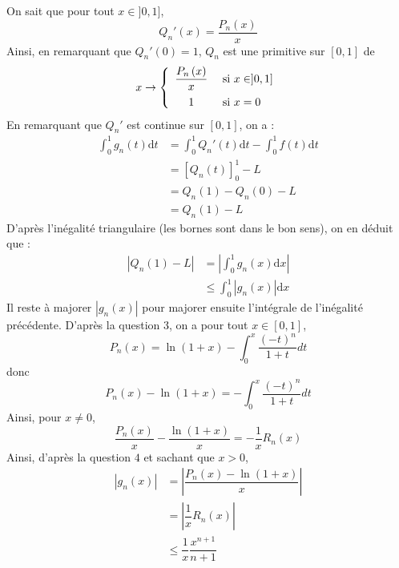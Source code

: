 \documentclass[a4paper,twoside,french,10pt]{VcCours}
\newcommand{\dt}{\text{d}t}
\newcommand{\dx}{\text{d}x}
\begin{document}
\begin{enumerate}
\noindent On sait que pour tout $x \in ]0,1]$,
$$Q_{n}'\left(  x\right)  =\dfrac{P_{n}\left(  x\right)  }{x}$$
Ainsi, en remarquant que $Q_n'(0)=1$, $Q_{n}$ est une primitive sur $[0,1]$ de 
$$x\rightarrow   \left\lbrace \begin{array}{cl}
\dfrac{P_{n}\left(  x\right)  }{x} & \hbox{ si } x \in ]0,1] \\[0.3cm]
1 & \hbox{ si } x=0 \\
\end{array}\right.$$
En remarquant que $Q_n'$ est continue sur $[0,1]$, on a :
\begin{align*}
\int_{0}^{1}g_{n}\left(  t\right)  \dt  & =\int_{0}^{1} Q_n'(t) \dt-\int_{0}^{1}f\left(  t\right)  \dt\\
& =\left[  Q_{n}\left(  t\right)  \right]  _{0}^{1}-L\\
& =Q_{n}\left(  1\right)  -Q_{n}\left(  0\right)  -L\\
& =Q_{n}\left(  1\right)  -L
\end{align*}
D'après l'inégalité triangulaire (les bornes sont dans le bon sens), on en déduit que :
\begin{align*}
\left\vert Q_{n}\left(  1\right)  -L\right\vert & =\left\vert \int_{0}^{1}g_{n}\left(  x\right)  \dx\right\vert\\
&  \leq\int_{0}^{1}\left\vert g_{n}\left(x\right)  \right\vert \dx
\end{align*}
Il reste \`a majorer $\left\vert g_{n}\left(  x\right)  \right\vert$ pour majorer ensuite l'intégrale de l'inégalité précédente. D'après la question 3, on a pour tout $x\in[0,1]$,
$$P_{n}\left(  x\right)  =\ln\left(  1+x\right)  -%
{\displaystyle\int_{0}^{x}}
\dfrac{\left(  -t\right)  ^{n}}{1+t}dt$$ 
donc
$$P_{n}\left(  x\right)  -\ln\left(  1+x\right)  =-%
{\displaystyle\int_{0}^{x}}
\dfrac{\left(  -t\right)  ^{n}}{1+t}dt$$
Ainsi, pour $x \neq 0$, 
$$\dfrac{P_{n}\left(  x\right)}{x}-\dfrac{\ln\left(  1+x\right)  }{x}=-\dfrac{1}{x}R_{n}\left(  x\right) $$
Ainsi, d'après la question $4$ et sachant que $x >0$,
\begin{align*}
\left\vert g_{n}\left(  x\right)  \right\vert &  =\left\vert \dfrac {P_{n}\left(  x\right)  -\ln\left(  1+x\right)  }{x}\right\vert \\
&  = \left\vert \dfrac{1}{x}R_{n}\left(  x\right)  \right\vert \\
& \leq\dfrac{1}{x}\dfrac{x^{n+1} }{n+1}\\

\end{align*}
\end{enumerate}
\end{document}
